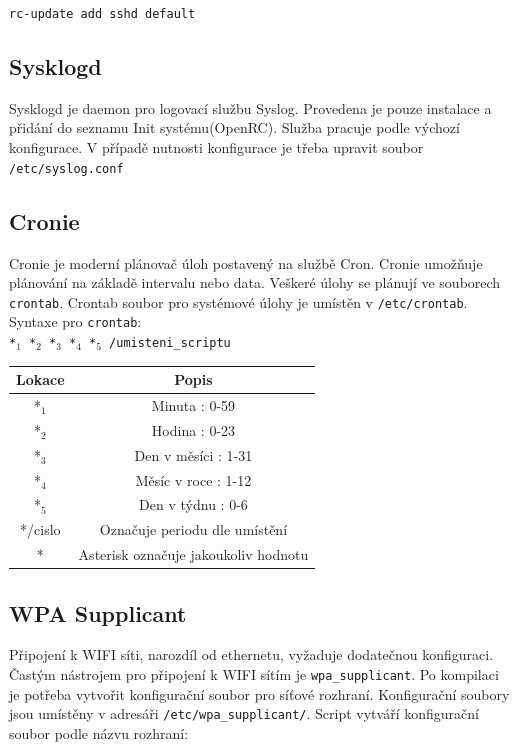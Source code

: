 \documentclass[12pt,a4paper,twoside,]{article}
\begin{document}
{{{{{{\texttt{rc-update add sshd default}
\subsection{\textsf{Sysklogd}} 
Sysklogd je daemon pro logovací službu Syslog. Provedena je pouze instalace a přidání do seznamu Init systému(OpenRC). Služba pracuje podle výchozí konfigurace. V případě nutnosti konfigurace je třeba upravit soubor \texttt{/etc/syslog.conf}

\subsection{\textsf{Cronie}}

Cronie je moderní plánovač úloh postavený na službě Cron. Cronie umožňuje plánování na základě intervalu nebo data. Veškeré úlohy se plánují ve souborech \texttt{crontab}. Crontab soubor pro systémové úlohy je umístěn v \texttt{/etc/crontab}. Syntaxe pro \texttt{crontab}:\\

\texttt{*$_{1}$ *$_{2}$ *$_{3}$ *$_{4}$ *$_{5}$ /umisteni\_scriptu}

\begin{table}[h]
	\centering
	\begin{tabular}{|c|c|}
		\hline 
		Lokace&Popis \\
		\hline
		*$_{1}$&  Minuta : 0-59 \\
		\hline
		*$_{2}$&  Hodina : 0-23 \\
		\hline
		*$_{3}$&  Den v měsíci : 1-31 \\
		\hline
		*$_{4}$&  Měsíc v roce : 1-12 \\
		\hline
		*$_{5}$&  Den v týdnu : 0-6 \\
		\hline
		*/cislo&  Označuje periodu dle umístění \\
		\hline
		*&  Asterisk označuje jakoukoliv hodnotu \\
		\hline
	\end{tabular}

\end{table}
\subsection{\textsf{WPA Supplicant}}
Připojení k WIFI síti, narozdíl od ethernetu, vyžaduje dodatečnou konfiguraci. Častým nástrojem pro připojení k WIFI sítím je \texttt{wpa\_supplicant}. Po kompilaci je potřeba vytvořit konfigurační soubor pro síťové rozhraní. Konfigurační soubory jsou umístěny v adresáři \texttt{/etc/wpa\_supplicant/}. Script vytváří konfigurační soubor podle názvu rozhraní:\\

}}}}}}
\end{document}
